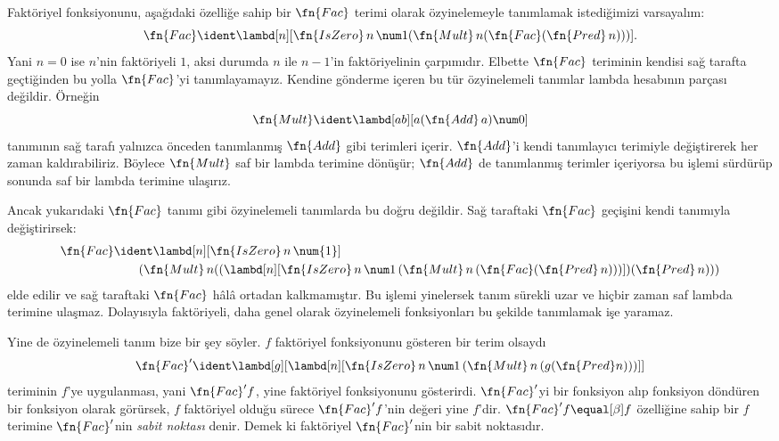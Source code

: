 



Faktöriyel fonksiyonunu, aşağıdaki özelliğe sahip bir $\fn{Fac}$ terimi olarak
özyinelemeyle tanımlamak istediğimizi varsayalım:
\[
\fn{Fac} \ident \lambd[n][\fn{IsZero}\, n\, \num 1
  (\fn{Mult}\, n (\fn{Fac}(\fn{Pred} \, n)))].
\]
Yani $n=0$ ise $n$'nin faktöriyeli $1$, aksi durumda $n$ ile $n-1$'in
faktöriyelinin çarpımıdır. Elbette $\fn{Fac}$ teriminin kendisi sağ tarafta
geçtiğinden bu yolla $\fn{Fac}$'yi tanımlayamayız. Kendine gönderme içeren bu
tür özyinelemeli tanımlar lambda hesabının parçası değildir. Örneğin
\[
\fn{Mult} \ident \lambd[ab][a (\fn{Add}\, a) \num0]
\]
tanımının sağ tarafı yalnızca önceden tanımlanmış $\fn{Add}$ gibi terimleri
içerir. $\fn{Add}$'i kendi tanımlayıcı terimiyle değiştirerek her zaman
kaldırabiliriz. Böylece $\fn{Mult}$ saf bir lambda terimine dönüşür;
$\fn{Add}$ de tanımlanmış terimler içeriyorsa bu işlemi sürdürüp sonunda saf
bir lambda terimine ulaşırız.

Ancak yukarıdaki $\fn{Fac}$ tanımı gibi özyinelemeli tanımlarda bu doğru
değildir. Sağ taraftaki $\fn{Fac}$ geçişini kendi tanımıyla değiştirirsek:
\begin{align*}
  \fn{Fac} & \ident \lambd[n][\fn{IsZero}\, n\, \num{1}] \\
    & \qquad (\fn{Mult}\, n
  ((\lambd[n][\fn{IsZero} \, n \, \num 1\, (\fn{Mult}\, n\, (\fn{Fac}
    (\fn{Pred}\, n)))]) (\fn{Pred}\, n)))
\end{align*}
elde edilir ve sağ taraftaki $\fn{Fac}$ hâlâ ortadan kalkmamıştır. Bu işlemi
yinelersek tanım sürekli uzar ve hiçbir zaman saf lambda terimine ulaşmaz.
Dolayısıyla faktöriyeli, daha genel olarak özyinelemeli fonksiyonları bu
şekilde tanımlamak işe yaramaz.

Yine de özyinelemeli tanım bize bir şey söyler. $f$ faktöriyel fonksiyonunu
gösteren bir terim olsaydı
\[
\fn{Fac}' \ident \lambd[g][\lambd[n][\fn{IsZero} \, n \, \num 1\,
  (\fn{Mult} \, n\, (g (\fn{Pred} n)))]]
\]
teriminin $f$'ye uygulanması, yani $\fn{Fac}'f$, yine faktöriyel
fonksiyonunu gösterirdi. $\fn{Fac}'$yi bir fonksiyon alıp fonksiyon döndüren
bir fonksiyon olarak görürsek, $f$ faktöriyel olduğu sürece
$\fn{Fac}'f$'nin değeri yine $f$'dir. $\fn{Fac}'f\equal[\beta]f$ özelliğine
sahip bir $f$ terimine $\fn{Fac}'$nin \emph{sabit noktası} denir. Demek ki
faktöriyel $\fn{Fac}'$nin bir sabit noktasıdır.

